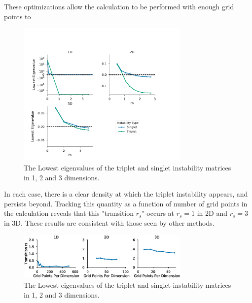 \documentclass{revtex4}
\begin{document}
     These optimizations allow the calculation to be performed with enough grid points to         
      \begin{figure}[H]
      \centering
        \includegraphics[width=0.75\textwidth]{../figures/stability.pdf}
        \caption{The Lowest eigenvalues of the triplet and singlet instability matrices in 1, 2 and
        3 dimensions.}
      \end{figure}   
        
    In each case, there is a clear density at which the triplet instability appears, and persists 
    beyond. Tracking this quantity as a function of number of grid points in the calculation 
    reveals that this "transition $r_s$" occurs at $r_s = 1$ in 2D and $r_s = 3$ in 3D. These 
    results are consistent with those seen by other methods. 
    \cite{Baguet2014}\cite{Bernu2011}

    \begin{figure}[H]
    \centering
      \includegraphics[width=0.75\textwidth]{../figures/triplet_onset.eps}
      \caption{The Lowest eigenvalues of the triplet and singlet instability matrices in 1, 2 and
      3 dimensions.}
    \end{figure}
    
    
\newpage
\end{document}
